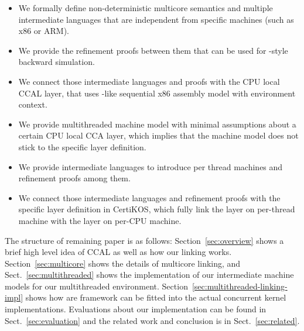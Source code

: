 \begin{itemize}
\item We formally define non-deterministic multicore semantics and multiple intermediate languages that are independent from specific machines (such as x86 or ARM). 
\item We provide the refinement proofs between them that can be used for \compcertkwd-style backward simulation. 
\item We connect those intermediate languages and proofs with the CPU local CCAL layer, that uses \compcertkwd-like sequential x86 assembly model with 
environment context.
\item We provide multithreaded machine model with minimal assumptions about a certain CPU local CCA layer, which implies that the machine model does not stick to the specific layer definition.
\item We provide intermediate languages to introduce per thread machines and refinement proofs among them. 
\item We connect those intermediate languages and refinement proofs with the specific layer definition in CertiKOS, which fully link the layer on per-thread machine with the layer on per-CPU machine.
\end{itemize}

The structure of remaining paper is as follows:
Section~\ref{sec:overview} shows a brief high level idea of CCAL as well as how our linking works. Section~\ref{sec:multicore} shows the details of multicore linking,
and Sect.~\ref{sec:multithreaded} shows the implementation of our intermediate machine models for our multithreaded environment.
Section~\ref{sec:multithreaded-linking-impl} shows how are framework 
can be fitted into the actual concurrent kernel implementations.
Evaluations about our implementation can be found in Sect.~\ref{sec:evaluation} 
and the related work and conclusion is in Sect.~\ref{sec:related}.


